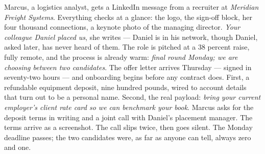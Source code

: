 

\begin{story}
Marcus, a logistics analyst, gets a LinkedIn message from a recruiter at \emph{Meridian Freight Systems}. Everything checks at a glance: the logo, the sign-off block, her four thousand connections, a keynote photo of the managing director. \emph{Your colleague Daniel placed us}, she writes --- Daniel is in his network, though Daniel, asked later, has never heard of them. The role is pitched at a 38 percent raise, fully remote, and the process is already warm: \emph{final round Monday; we are choosing between two candidates}. The offer letter arrives Thursday --- signed in seventy-two hours --- and onboarding begins before any contract does. First, a refundable equipment deposit, nine hundred pounds, wired to account details that turn out to be a personal name. Second, the real payload: \emph{bring your current employer's client rate card so we can benchmark your book}. Marcus asks for the deposit terms in writing and a joint call with Daniel's placement manager. The terms arrive as a screenshot. The call slips twice, then goes silent. The Monday deadline passes; the two candidates were, as far as anyone can tell, always zero and one.
\end{story}

